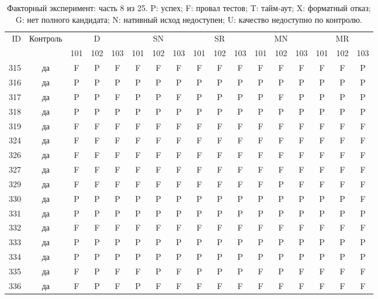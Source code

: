 \begin{table}[p]\centering\footnotesize
\setlength{\tabcolsep}{3pt}
\caption{Факторный эксперимент: часть 8 из 25. P: успех; F: провал тестов; T: тайм-аут; X: форматный отказ; G: нет полного кандидата; N: нативный исход недоступен; U: качество недоступно по контролю.}
\begin{tabular*}{\textwidth}{@{\extracolsep{\fill}}rcccccccccccccccc}\toprule
ID & Контроль & \multicolumn{3}{c}{D} & \multicolumn{3}{c}{SN} & \multicolumn{3}{c}{SR} & \multicolumn{3}{c}{MN} & \multicolumn{3}{c}{MR}\\
\cmidrule(lr){3-5}\cmidrule(lr){6-8}\cmidrule(lr){9-11}\cmidrule(lr){12-14}\cmidrule(lr){15-17}
 & & 101 & 102 & 103 & 101 & 102 & 103 & 101 & 102 & 103 & 101 & 102 & 103 & 101 & 102 & 103\\\midrule
315 & да & F & P & F & F & F & F & F & F & F & F & F & F & F & F & P\\
316 & да & P & P & P & P & P & P & P & P & P & P & P & P & P & P & P\\
317 & да & P & P & F & P & P & F & P & P & P & P & F & P & P & P & P\\
318 & да & P & P & P & P & P & P & P & P & P & P & P & P & P & P & P\\
319 & да & F & F & F & F & F & F & F & F & F & F & F & F & F & F & F\\
324 & да & F & F & F & F & F & F & F & F & F & F & F & F & F & F & F\\
326 & да & F & F & F & F & F & F & F & F & F & F & F & F & F & F & F\\
327 & да & F & F & F & F & F & F & F & F & F & F & F & F & F & F & F\\
329 & да & F & F & F & F & F & F & F & F & F & F & P & F & F & F & F\\
330 & да & P & P & P & P & P & P & P & P & P & P & P & P & P & P & F\\
331 & да & P & P & P & P & P & P & P & P & P & P & P & P & P & P & P\\
332 & да & F & F & F & F & F & F & F & F & F & F & F & F & F & F & F\\
333 & да & P & P & P & P & P & P & P & P & P & P & P & P & P & P & P\\
334 & да & P & P & P & P & P & P & P & P & P & P & P & P & P & P & P\\
335 & да & F & P & F & F & P & F & P & P & P & F & P & F & F & F & F\\
336 & да & F & P & F & P & F & F & F & F & F & F & F & F & F & F & F\\

\end{tabular*}
\end{table}
